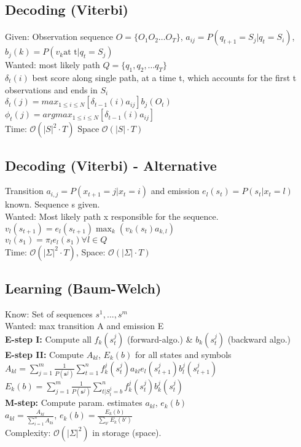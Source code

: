\subsection*{Decoding (Viterbi)}
Given: Observation sequence  $O= \{O_1 O_2 \dots O_T \}$, $a_{ij} = P(q_{t+1} = S_j | q_t = S_i)$, $b_j(k)=P(v_k \text{at t} |q_t = S_j)$ \\
Wanted: most likely path $Q = \{q_1,q_2,\ldots q_T\}$\\
$\delta_t (i) $ best score along single path, at a time t, which accounts for the first t observations and ends in $S_i$\\
$\delta_t (j) = max_{1 \leq i \leq N}[\delta_{t-1} (i)a_{ij}]b_j(O_t) $\\
$\phi_t(j)=argmax_{1\leq i \leq N} [\delta_{t-1}(i)a_{ij}]$\\
Time: $\mathcal{O}(|S|^2 \cdot T)$
Space $\mathcal{O}(|S| \cdot T)$

\subsection*{Decoding (Viterbi) - Alternative}
Transition $a_{i,j} = P(x_{t+1} = j |x_t = i)$ and emission $e_l(s_t) = P(s_t|x_t=l)$ known. Sequence s given.\\
Wanted: Most likely path x responsible for the sequence.\\
$v_l(s_{t+1}) = e_l(s_{t+1}) \max_k(v_k(s_t) a_{k,l})$\\
$v_l(s_1) = \pi_l e_l(s_1) \forall l \in Q$\\
Time: $\mathcal{O}(|\Sigma|^2 \cdot T)$, Space: $\mathcal{O}(|\Sigma| \cdot T)$
\subsection*{Learning (Baum-Welch)}
Know: Set of sequences $s^1,...,s^m$\\
Wanted: max transition A and emission E\\
\textbf{E-step I:} Compute all $f_k(s_t^j)$ (forward-algo.) \& $b_k(s_t^j)$ (backward algo.)\\
\textbf{E-step II:} Compute $A_{kl}$, $E_k(b)$ for all states and symbols\\
$A_{kl} = \sum_{j=1}^{m} \frac{1}{P(\textbf{s}^j)} \sum_{t=1}^{n}f_k^j (s_t^j)a_{kl}e_l(s_{t+1}^j)b_l^j(s_{t+1}^j)$\\
$E_k(b)=\sum_{j=1}^{m}\frac{1}{P(\textbf{s}^j)}\sum_{t|S_t^j=b}^{n}f_k^j(s_t^j)b_k^j(s_t^j)$\\
\textbf{M-step:} Compute param. estimates $a_{kl}$, $e_k(b)$\\
$a_{kl}=\frac{A_{kl}}{\sum_{i=1}^{n}A_{ki}}$, $e_k(b)=\frac{E_k(b)}{\sum_{b'}E_k(b')}$\\
Complexity: $\mathcal{O}(|\Sigma|^2)$ in storage (space).